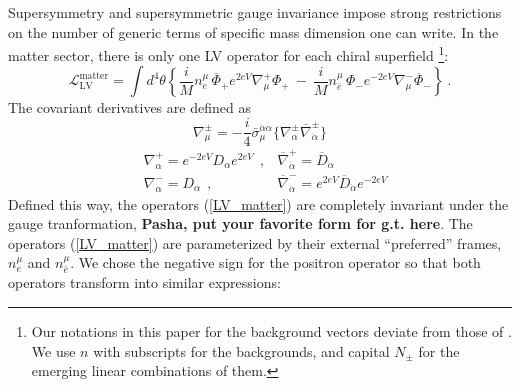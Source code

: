 \documentclass[paper,12pt]{revtex4}
\begin{document}
	Supersymmetry and supersymmetric gauge invariance impose strong
	restrictions on the number of generic terms of specific mass
	dimension one can write.
	In the matter sector, there is only  one LV operator for each chiral superfield
\footnote{
	Our notations in this paper for the background vectors deviate
	from those of \cite{GrootNibbelink:2004za}.
	We use $ n $ with subscripts for the backgrounds, and 
	capital $ N_\pm $ for the emerging linear combinations of 
	them.}:
\begin{equation}
\label{LV_matter}
  \mathcal{L}_{\mathrm{LV}}^{\mathrm{matter}} = 
  \int d^4\theta \left\{ 
           \frac{i}{M} n_e^\mu\, \overline{\Phi}_+ e^{2eV} \nabla^+_\mu 
	                                                   \Phi_+ ~
	-~ \frac{i}{M} n_{\bar{e}}^\mu\, 
                          \Phi_- e^{-2eV} \nabla^-_\mu 
			  \overline{\Phi}_-
                 \right\}~.
\end{equation}
	The covariant derivatives are defined as
\[
          \nabla^\pm_\mu = - \frac{i}
                                  {4} \bar{\sigma}_\mu^{\dot{\alpha}\alpha}
	  	  \{ \nabla^\pm_\alpha 
		      \overline{\nabla}^\pm_{\dot{\alpha}} \} 
\]
\begin{eqnarray*}
        & \nabla^+_\alpha = e^{-2eV} D_\alpha e^{2eV}~~,
        & \overline{\nabla}^+_{\dot{\alpha}} = \overline{D}_{\dot{\alpha}} \\
        & \nabla^-_\alpha = D_\alpha~~,~~~~~~~~~~~~
        & \overline{\nabla}^-_{\dot{\alpha}} = e^{2eV} \overline{D}_{\dot{\alpha}}
                                    e^{-2eV}
\end{eqnarray*}
Defined this way, the operators (\ref{LV_matter}) are completely invariant under the gauge 
tranformation, {\bf Pasha, put your favorite form for g.t. here}.
The operators 
  (\ref{LV_matter})
	are parameterized by their external ``preferred''
	frames, $ n_e^\mu $ and $ n_{\bar{e}}^\mu $. 
	We chose the negative sign for the positron operator so that
	both operators transform into similar expressions:
\end{document}
